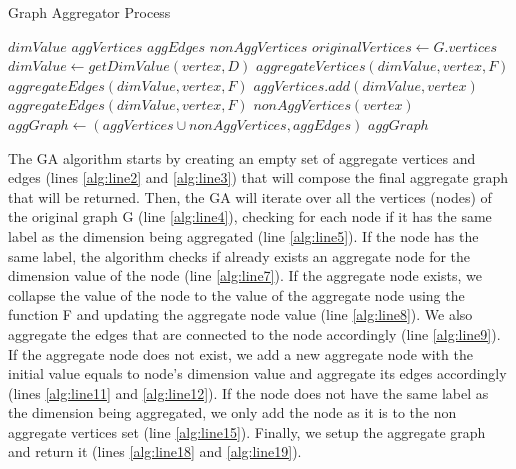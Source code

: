 \begin{algorithm}[!ht]
 \caption{Graph Aggregator Process}
 \label{alg:algorithm1}
  \begin{algorithmic}[1]
      \State $dimValue$ 
      \State $aggVertices$   \label{alg:line2}
      \State $aggEdges$  \label{alg:line3}
      \State $nonAggVertices$   \label{alg:line31}
      \State $originalVertices \gets G.vertices$  \label{alg:line32}
        \label{alg:line4}
          \label{alg:line5}
          \State $dimValue \gets getDimValue(vertex, D)$
             \label{alg:line7}
             \State $aggregateVertices(dimValue, vertex, F)$  \label{alg:line8}
             \State $aggregateEdges(dimValue, vertex, F)$  \label{alg:line9}
           \Else
              \State $aggVertices.add(dimValue, vertex)$  \label{alg:line11}
              \State $aggregateEdges(dimValue, vertex, F)$  \label{alg:line12}
           \EndIf
       \Else
          \State $nonAggVertices(vertex)$   \label{alg:line15}
        \EndIf
      \EndFor
      \State $aggGraph \gets (aggVertices \cup nonAggVertices, aggEdges)$  \label{alg:line18}
      \State \Return $aggGraph$  \label{alg:line19}
    \EndFunction
  \end{algorithmic}
\end{algorithm}

The GA algorithm starts by creating an empty set of aggregate vertices and edges (lines \ref{alg:line2} and \ref{alg:line3}) that will compose the final aggregate graph that will be returned. Then, the GA will iterate over all the vertices (nodes) of the original graph G (line \ref{alg:line4}), checking for each node if it has the same label as the dimension being aggregated (line \ref{alg:line5}). If the node has the same label, the algorithm checks if already exists an aggregate node for the dimension value of the node (line \ref{alg:line7}). If the aggregate node exists, we collapse the value of the node to the value of the aggregate node using the function F and updating the aggregate node value (line \ref{alg:line8}). We also aggregate the edges that are connected to the node accordingly (line \ref{alg:line9}). If the aggregate node does not exist, we add a new aggregate node with the initial value equals to node's dimension value and aggregate its edges accordingly (lines \ref{alg:line11} and \ref{alg:line12}). If the node does not have the same label as the dimension being aggregated, we only add the node as it is to the non aggregate vertices set (line \ref{alg:line15}). Finally, we setup the aggregate graph and return it (lines \ref{alg:line18} and \ref{alg:line19}).

